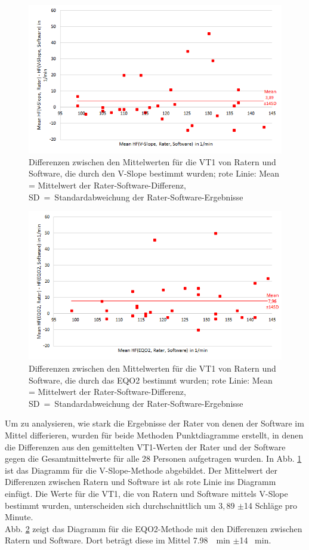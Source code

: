 %
\begin{figure}[H]
	\centering
	\includegraphics[scale=0.7]{Bilder/mean_vslope}
	\caption[Differenzen der V-Slope-Ergebnisse zwischen Ratern und Software]{Differenzen zwischen den Mittelwerten für die VT1 von Ratern und Software, die durch den V-Slope bestimmt wurden; rote Linie: Mean = Mittelwert der Rater-Software-Differenz, SD~=~Standardabweichung der Rater-Software-Ergebnisse}
	\label{pic:pic23}
\end{figure}
%
\begin{figure}[H]
	\centering
	\includegraphics[scale=0.7]{Bilder/mean_eqo2}
	\caption[Differenzen der \gls{EQO2}-Ergebnisse zwischen Ratern und Software]{Differenzen zwischen den Mittelwerten für die VT1 von Ratern und Software, die durch das \gls{EQO2} bestimmt wurden; rote Linie: Mean = Mittelwert der Rater-Software-Differenz, SD~=~Standardabweichung der Rater-Software-Ergebnisse}
	\label{pic:pic24}
\end{figure}
%
Um zu analysieren, wie stark die Ergebnisse der Rater von denen der Software im Mittel differieren, wurden für beide Methoden Punktdiagramme erstellt, in denen die Differenzen aus den gemittelten VT1-Werten der Rater und der Software gegen die Gesamtmittelwerte für alle 28 Personen aufgetragen wurden. In Abb. \ref{pic:pic23} ist das Diagramm für die V-Slope-Methode abgebildet. Der Mittelwert der Differenzen zwischen Ratern und Software ist als rote Linie ins Diagramm einfügt. Die Werte für die VT1, die von Ratern und Software mittels V-Slope bestimmt wurden, unterscheiden sich durchschnittlich um $3,89$ $\pm$14 Schläge pro Minute.\\
Abb. \ref{pic:pic24} zeigt das Diagramm für die \gls{EQO2}-Methode mit den Differenzen zwischen Ratern und Software. Dort beträgt diese im Mittel \SI{7,98}{\per\minute} $\pm$14 \si{\per\minute}.
%
